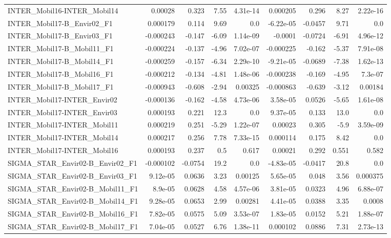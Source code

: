 \begin{tabular}{lrrrrrrrr}
INTER_Mobil16-INTER_Mobil14 & 0.00028 & 0.323 & 7.55 & 4.31e-14 & 0.000205 & 0.296 & 8.27 & 2.22e-16 \\
INTER_Mobil17-B_Envir02_F1 & 0.000179 & 0.114 & 9.69 & 0.0 & -6.22e-05 & -0.0457 & 9.71 & 0.0 \\
INTER_Mobil17-B_Envir03_F1 & -0.000243 & -0.147 & -6.09 & 1.14e-09 & -0.0001 & -0.0724 & -6.91 & 4.96e-12 \\
INTER_Mobil17-B_Mobil11_F1 & -0.000224 & -0.137 & -4.96 & 7.02e-07 & -0.000225 & -0.162 & -5.37 & 7.91e-08 \\
INTER_Mobil17-B_Mobil14_F1 & -0.000259 & -0.157 & -6.34 & 2.29e-10 & -9.21e-05 & -0.0689 & -7.38 & 1.62e-13 \\
INTER_Mobil17-B_Mobil16_F1 & -0.000212 & -0.134 & -4.81 & 1.48e-06 & -0.000238 & -0.169 & -4.95 & 7.3e-07 \\
INTER_Mobil17-B_Mobil17_F1 & -0.000943 & -0.608 & -2.94 & 0.00325 & -0.000863 & -0.639 & -3.12 & 0.00184 \\
INTER_Mobil17-INTER_Envir02 & -0.000136 & -0.162 & -4.58 & 4.73e-06 & 3.58e-05 & 0.0526 & -5.65 & 1.61e-08 \\
INTER_Mobil17-INTER_Envir03 & 0.000193 & 0.221 & 12.3 & 0.0 & 9.37e-05 & 0.133 & 13.0 & 0.0 \\
INTER_Mobil17-INTER_Mobil11 & 0.000219 & 0.251 & -5.29 & 1.22e-07 & 0.00023 & 0.305 & -5.9 & 3.59e-09 \\
INTER_Mobil17-INTER_Mobil14 & 0.000217 & 0.256 & 7.78 & 7.33e-15 & 0.000114 & 0.175 & 8.42 & 0.0 \\
INTER_Mobil17-INTER_Mobil16 & 0.000193 & 0.237 & 0.5 & 0.617 & 0.00021 & 0.292 & 0.551 & 0.582 \\
SIGMA_STAR_Envir02-B_Envir02_F1 & -0.000102 & -0.0754 & 19.2 & 0.0 & -4.83e-05 & -0.0417 & 20.8 & 0.0 \\
SIGMA_STAR_Envir02-B_Envir03_F1 & 9.12e-05 & 0.0636 & 3.23 & 0.00125 & 5.65e-05 & 0.048 & 3.56 & 0.000375 \\
SIGMA_STAR_Envir02-B_Mobil11_F1 & 8.9e-05 & 0.0628 & 4.58 & 4.57e-06 & 3.81e-05 & 0.0323 & 4.96 & 6.88e-07 \\
SIGMA_STAR_Envir02-B_Mobil14_F1 & 9.28e-05 & 0.0653 & 2.99 & 0.00281 & 4.41e-05 & 0.0388 & 3.35 & 0.0008 \\
SIGMA_STAR_Envir02-B_Mobil16_F1 & 7.82e-05 & 0.0575 & 5.09 & 3.53e-07 & 1.83e-05 & 0.0152 & 5.21 & 1.88e-07 \\
SIGMA_STAR_Envir02-B_Mobil17_F1 & 7.04e-05 & 0.0527 & 6.76 & 1.38e-11 & 0.000102 & 0.0886 & 7.31 & 2.73e-13 \\

\end{tabular}
